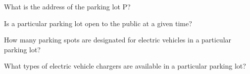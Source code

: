 \begin{namedbreak}
    What is the address of the parking lot P?
\end{namedbreak}

\begin{namedbreak}
    Is a particular parking lot open to the public at a given time?
\end{namedbreak}

\begin{namedbreak}
    How many parking spots are designated for electric vehicles in a particular parking lot?
\end{namedbreak}

\begin{namedbreak}
    What types of electric vehicle chargers are available in a particular parking lot?
\end{namedbreak}